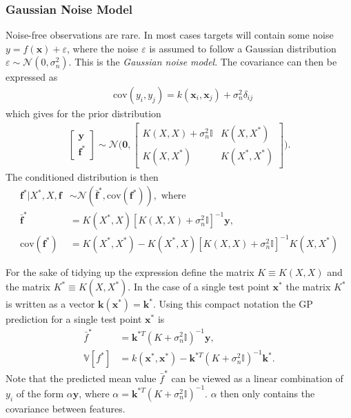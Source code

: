 \documentclass[twoside,english]{uiofysmaster}
\begin{document}
\subsubsection{Gaussian Noise Model}

Noise-free observations are rare. In most cases targets will contain some noise $y = f(\textbf{x}) + \varepsilon$, where the noise $\varepsilon$ is assumed to follow a Gaussian distribution $\varepsilon \sim \mathcal{N}(0, \sigma_n^2)$. This is the \textit{Gaussian noise model}. The covariance can then be expressed as
\begin{align}
&\text{cov}(y_i, y_j) = k(\textbf{x}_i, \textbf{x}_j) + \sigma_n^2 \delta_{ij} 
\end{align}
which gives for the prior distribution
\begin{align}
\begin{bmatrix}
\textbf{y}\\
\textbf{f}^*
\end{bmatrix}
\sim 
\mathcal{N} \Bigg(
\boldsymbol{0},
\begin{bmatrix}
K(X, X) + \sigma_n^2 \mathbb{I} & K(X, X^*)\\
K(X, X^*) & K(X^*, X^*)
\end{bmatrix}
 \Bigg).
\end{align}
The conditioned distribution is then 
\begin{align}
\textbf{f}^* \big| X^*, X, \textbf{f} & \sim \mathcal{N}(\bar{\textbf{f}}^*, \text{cov}(\textbf{f}^*)), \text{ where} \\
\bar{\textbf{f}}^* &= K(X^*, X) [K(X, X) + \sigma_n^2 \mathbb{I}]^{-1} \textbf{y},\\
\text{cov} (\textbf{f}^*) &= K(X^*, X^*) - K(X^*, X)[K(X, X) + \sigma_n^2 \mathbb{I}]^{-1} K(X, X^*) 
\end{align}

For the sake of tidying up the expression define the matrix $K \equiv K(X, X)$ and the matrix $K^* \equiv K(X, X^*)$. In the case of a single test point $\textbf{x}^*$ the matrix $K^*$ is written as a vector $\textbf{k}(\textbf{x}^*) = \textbf{k}^*$. Using this compact notation the GP prediction for a single test point $\textbf{x}^*$ is
\begin{align}
\bar{f}^* &= \textbf{k}^{*T}(K + \sigma_n^2\mathbb{I})^{-1} \textbf{y},\label{Eq:: gaussian process : GP prediction mean}\\
\mathbb{V}[f^*] &= k(\textbf{x}^*, \textbf{x}^*) - \textbf{k}^{*T}(K + \sigma_n^2 \mathbb{I})^{-1} \textbf{k}^*\label{Eq:: gaussian process : GP prediction variance}.
\end{align}
Note that the predicted mean value $\bar{f}^*$ can be viewed as a linear combination of $y_i$ of the form $\alpha \textbf{y}$, where $\alpha = \textbf{k}^{*T}(K + \sigma_n^2\mathbb{I})^{-1}$. $\alpha$ then only contains the covariance between features.
\end{document}
